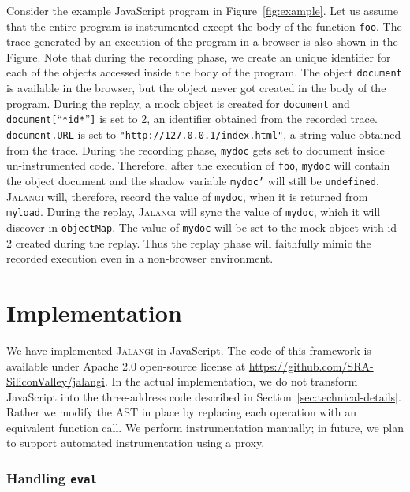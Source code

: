 \documentclass{sig-alternate}
\def\jalangi{\textsc{Jalangi}}
\begin{document}
Consider the example JavaScript program in Figure~\ref{fig:example}.
Let us assume that the entire program is instrumented except the body
of the function \texttt{foo}.  The trace generated by an execution of
the program in a browser is also shown in the Figure.  Note that
during the recording phase, we create an unique identifier for each of
the objects accessed inside the body of the program.  The object
\texttt{document} is available in the browser, but the object never
got created in the body of the program.  During the replay, a mock
object is created for \texttt{document} and
\texttt{document[}``\texttt{*id*}''\texttt{]} is set to 2, an identifier obtained from
the recorded trace.  \texttt{document.URL} is set to
\texttt{"http://127.0.0.1/index.html"}, a string value obtained from
the trace.  During the recording phase, \texttt{mydoc} gets set to
document inside un-instrumented code.  Therefore, after the execution
of \texttt{foo}, \texttt{mydoc} will contain the object document and
the shadow variable \texttt{mydoc'} will still be \texttt{undefined}.
\jalangi{} will, therefore, record the value of \texttt{mydoc}, when
it is returned from \texttt{myload}.  During the replay, \jalangi{}
will sync the value of \texttt{mydoc}, which it will discover in
\texttt{objectMap}.  The value of \texttt{mydoc} will be set to the
mock object with id 2 created during the replay.  Thus the replay
phase will faithfully mimic the recorded execution even in a
non-browser environment.

\section{Implementation}
\label{sec:implementation}

We have implemented \jalangi{} in JavaScript.  The code of this
framework is available under Apache 2.0 open-source license at
\url{https://github.com/SRA-SiliconValley/jalangi}.  In the actual
implementation, we do not transform JavaScript into the three-address
code described in Section~\ref{sec:technical-details}.  Rather we
modify the AST in place by replacing each operation with an equivalent
function call.  We perform instrumentation manually; in future, we
plan to support automated instrumentation using a proxy.

\subsubsection*{Handling \texttt{eval}}
\label{sec:handling-texttteval}
\end{document}

